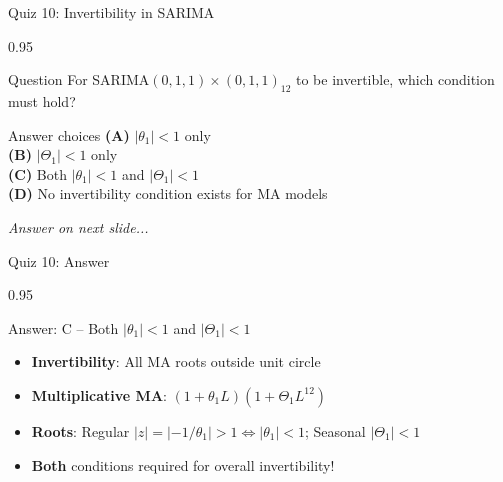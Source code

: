 \documentclass[9pt, aspectratio=169, t]{beamer}
\begin{document}
\begin{frame}{Quiz 10: Invertibility in SARIMA}
    \begin{cminipage}{0.95\textwidth}
    \begin{alertblock}{Question}
        For SARIMA$(0,1,1) \times (0,1,1)_{12}$ to be invertible, which condition must hold?
    \end{alertblock}

    \vspace{0.4cm}

    \begin{block}{Answer choices}
        \textcolor{MainBlue}{\textbf{(A)}} $|\theta_1| < 1$ only\\[3pt]
        \textcolor{MainBlue}{\textbf{(B)}} $|\Theta_1| < 1$ only\\[3pt]
        \textcolor{MainBlue}{\textbf{(C)}} Both $|\theta_1| < 1$ and $|\Theta_1| < 1$\\[3pt]
        \textcolor{MainBlue}{\textbf{(D)}} No invertibility condition exists for MA models
    \end{block}

    \vspace{0.5cm}

    \begin{center}
        \textit{Answer on next slide...}
    \end{center}
    \end{cminipage}
\end{frame}

\begin{frame}{Quiz 10: Answer}
    \begin{cminipage}{0.95\textwidth}
    \begin{exampleblock}{Answer: C -- Both $|\theta_1| < 1$ and $|\Theta_1| < 1$}
        \begin{itemize}
            \item \textbf{Invertibility}: All MA roots outside unit circle
            \item \textbf{Multiplicative MA}: $(1+\theta_1 L)(1+\Theta_1 L^{12})$
            \item \textbf{Roots}: Regular $|z| = |{-1}/{\theta_1}| > 1 \Leftrightarrow |\theta_1| < 1$; Seasonal $|\Theta_1| < 1$
            \item \textbf{Both} conditions required for overall invertibility!
        \end{itemize}
    \end{exampleblock}

    \end{cminipage}
\end{frame}
\end{document}
